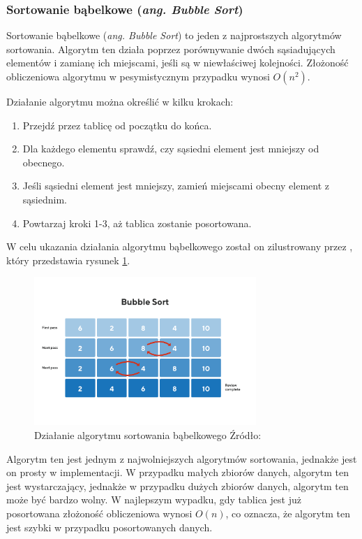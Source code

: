 \subsubsection{Sortowanie bąbelkowe (\textit{ang. Bubble Sort})}
Sortowanie bąbelkowe (\textit{ang. Bubble Sort}) to jeden z najprostszych algorytmów sortowania. Algorytm ten działa poprzez porównywanie dwóch sąsiadujących elementów i zamianę ich miejscami, jeśli są w niewłaściwej kolejności. Złożoność obliczeniowa algorytmu w pesymistycznym przypadku wynosi $O(n^2)$.

Działanie algorytmu można określić w kilku krokach:
\begin{enumerate}
  \item Przejdź przez tablicę od początku do końca.
  \item Dla każdego elementu sprawdź, czy sąsiedni element jest mniejszy od obecnego.
  \item Jeśli sąsiedni element jest mniejszy, zamień miejscami obecny element z sąsiednim.
  \item Powtarzaj kroki 1-3, aż tablica zostanie posortowana.
\end{enumerate}

W celu ukazania działania algorytmu bąbelkowego został on zilustrowany przez \cite{bubble_sort}, który przedstawia rysunek \ref{fig:bubble_sort}.

\begin{figure}[H]
  \centering
  \includegraphics[width=0.75\textwidth]{Figures/bubble_sort.png}
  \caption{Działanie algorytmu sortowania bąbelkowego Źródło: \cite{bubble_sort}}
  \label{fig:bubble_sort}
\end{figure}

Algorytm ten jest jednym z najwolniejszych algorytmów sortowania, jednakże jest on prosty w implementacji. W przypadku małych zbiorów danych, algorytm ten jest wystarczający, jednakże w przypadku dużych zbiorów danych, algorytm ten może być bardzo wolny. W najlepszym wypadku, gdy tablica jest już posortowana złożoność obliczeniowa wynosi $O(n)$, co oznacza, że algorytm ten jest szybki w przypadku posortowanych danych.

